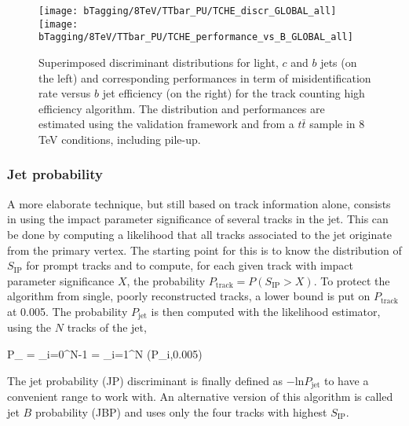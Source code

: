     \begin{figure}[th!]
        \centering
        \begin{minipage}{\textwidth}
        \texttt{[image: bTagging/8TeV/TTbar\_PU/TCHE\_discr\_GLOBAL\_all]}
        \texttt{[image: bTagging/8TeV/TTbar\_PU/TCHE\_performance\_vs\_B\_GLOBAL\_all]}
        \end{minipage}
        \caption{Superimposed discriminant distributions for light, $c$ and $b$ jets (on
        the left) and corresponding performances in term of misidentification rate versus $b$ jet efficiency
        (on the right) for the track counting high efficiency algorithm.
        The distribution and performances are estimated using the validation framework and from
        a $t\bar{t}$ sample in 8 TeV conditions, including pile-up.}
        \label{fig:bTagging/perfTC}
    \end{figure}

        \subsubsection{Jet probability}

    A more elaborate technique, but still based on track information alone, consists in
    using the impact parameter significance of
    several tracks in the jet. This can be done by computing a likelihood that all tracks
    associated to the jet originate from the primary vertex. The starting point for this
    is to know the distribution of $S_\text{IP}$ for prompt tracks and to compute, for
    each given track with impact parameter significance $X$, the probability $P_\text{track} =
    P(S_\text{IP} > X)$. To protect the algorithm from single, poorly reconstructed tracks,
    a lower bound is put on $P_\text{track}$ at 0.005. The probability $P_\text{jet}$ is
    then computed with the likelihood estimator, using the $N$ tracks of the jet,

    {
        P_ = \Pi \cdot \sum_{i=0}^{N-1}   \Pi = \prod_{i=1}^{N} (P_{i},0.005)
    }

    The jet probability (JP) discriminant is finally defined as $- \text{ln} P_\text{jet}$
    to have a convenient range to work with. An alternative version of this algorithm is
    called jet $B$ probability (JBP) and uses only the four tracks with highest $S_\text{IP}$.

